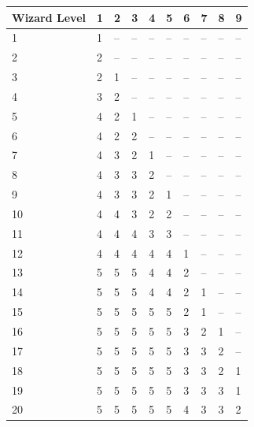 \noindent
\begin{minipage}{\columnwidth}

\label{wizardspells}
\noindent
\begin{tabular}{|m{}|m{}|m{}|m{}|m{}|m{}|m{}|m{}|m{}|m{}|}
\hline
Wizard Level	& 1	& 2	& 3	& 4	& 5	& 6	& 7	& 8	& 9 \\
\hline\hline
\rowcolor[gray]{.9}1	& 1	& --	& --	& --	& --	& --	& --	& --	& -- \\
2	& 2	& --	& --	& --	& --	& --	& --	& --	& -- \\
\rowcolor[gray]{.9}3	& 2	& 1		& --	& --	& --	& --	& --	& --	& -- \\
4	& 3	& 2		& --	& --	& --	& --	& --	& --	& -- \\
\rowcolor[gray]{.9}5	& 4	& 2		& 1		& --	& --	& --	& --	& --	& -- \\
6	& 4	& 2		& 2		& --	& --	& --	& --	& --	& -- \\
\rowcolor[gray]{.9}7	& 4	& 3		& 2		& 1		& --	& --	& --	& --	& -- \\
8	& 4	& 3		& 3		& 2		& --	& --	& --	& --	& -- \\
\rowcolor[gray]{.9}9	& 4	& 3		& 3		& 2		& 1		& --	& --	& --	& -- \\
10	& 4	& 4		& 3		& 2		& 2		& --	& --	& --	& -- \\
\rowcolor[gray]{.9}11	& 4	& 4		& 4		& 3		& 3		& --	& --	& --	& -- \\
12	& 4	& 4		& 4		& 4		& 4		& 1		& --	& --	& -- \\
\rowcolor[gray]{.9}13	& 5	& 5		& 5		& 4		& 4 	& 2		& --	& --	& -- \\
14	& 5	& 5		& 5		& 4		& 4		& 2		& 1		& --	& -- \\
\rowcolor[gray]{.9}15	& 5	& 5		& 5		& 5		& 5		& 2		& 1		& --	& -- \\
16	& 5	& 5		& 5		& 5		& 5		& 3		& 2		& 1		& -- \\
\rowcolor[gray]{.9}17	& 5	& 5		& 5		& 5		& 5		& 3		& 3		& 2		& -- \\
18	& 5	& 5		& 5		& 5		& 5		& 3		& 3		& 2		& 1 \\
\rowcolor[gray]{.9}19	& 5	& 5		& 5		& 5		& 5		& 3		& 3		& 3		& 1 \\
20	& 5	& 5		& 5		& 5		& 5		& 4		& 3		& 3		& 2 \\
\hline
\end{tabular}

\end{minipage}

